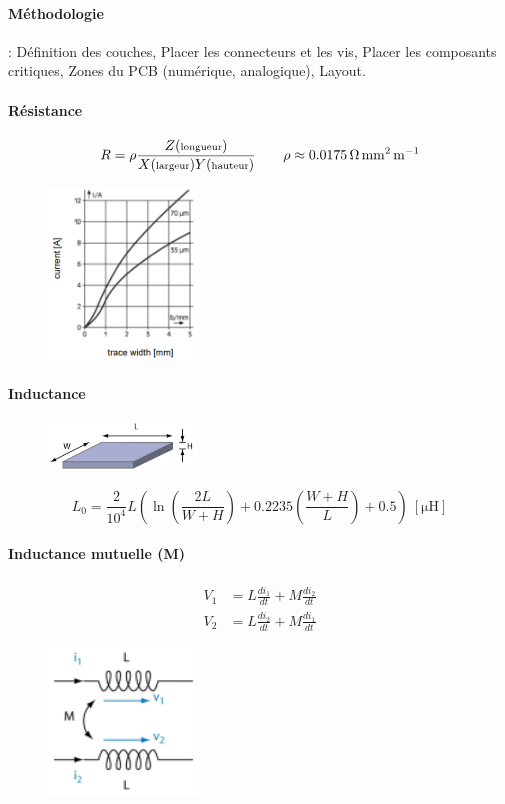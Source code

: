 \documentclass[resume]{subfiles}
\begin{document}
\begin{multicols}{3}
\paragraph{Méthodologie} : Définition des couches, Placer les connecteurs et les vis, Placer les composants critiques, Zones du PCB (numérique, analogique), Layout.\\
\paragraph{Résistance}
$$R = \rho \frac{Z(\text{\scriptsize longueur})}{X(\text{\scriptsize largeur})Y(\text{\scriptsize hauteur})}\qquad \rho\approx\SI{0.0175}{\ohm\square\milli\meter\per\meter}$$
\begin{figure}[H]
\centering
\includegraphics[width=4.00cm]{img_10.png}
\end{figure}
\paragraph{Inductance}
\begin{figure}[H]
\centering
\includegraphics[width=4.00cm]{img_11.png}
\end{figure}
\begin{scriptsize}
$$L_0=\frac{2}{10^{4}}L\left(\ln\left(\frac{2L}{W+H}\right)+0.2235\left(\frac{W+H}{L}\right)+0.5\right)\ [\si{\micro\henry}]$$
\end{scriptsize}
\paragraph{Inductance mutuelle (M)}
\begin{align*}
V_1&=L\frac{di_1}{dt}+M\frac{di_2}{dt}\\
V_2&=L\frac{di_2}{dt}+M\frac{di_1}{dt}
\end{align*}
\begin{figure}[H]
\centering
\includegraphics[width=4.00cm]{img_12.png}
\end{figure}

\end{multicols}
\end{document}
